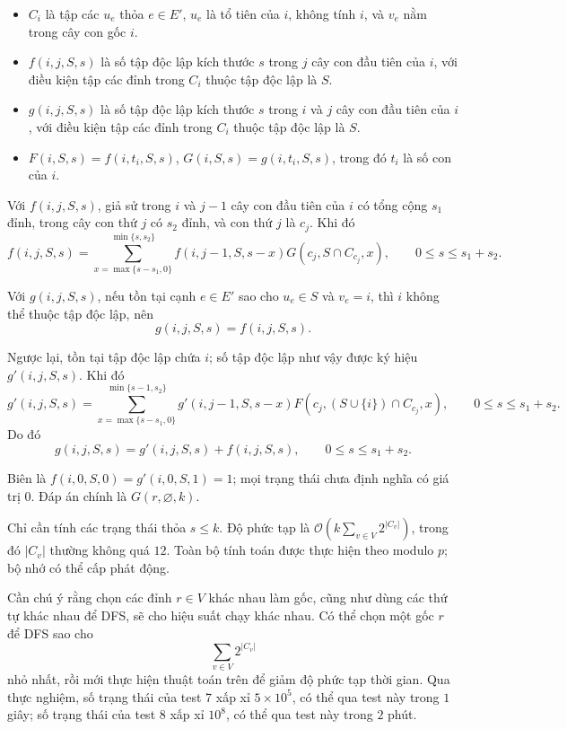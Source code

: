 \documentclass[11pt]{article}
\newcommand{\Oh}{\mathcal{O}}
\begin{document}
\begin{itemize}
  \item \(C_i\) là tập các \(u_e\) thỏa \(e\in E'\), \(u_e\) là tổ tiên của
  \(i\), không tính \(i\), và \(v_e\) nằm trong cây con gốc \(i\).

  \item \(f(i,j,S,s)\) là số tập độc lập kích thước \(s\) trong \(j\) cây con
  đầu tiên của \(i\), với điều kiện tập các đỉnh trong \(C_i\) thuộc tập độc
  lập là \(S\).

  \item \(g(i,j,S,s)\) là số tập độc lập kích thước \(s\) trong \(i\) và \(j\)
  cây con đầu tiên của \(i\), với điều kiện tập các đỉnh trong \(C_i\) thuộc
  tập độc lập là \(S\).

  \item \(F(i,S,s)=f(i,t_i,S,s)\), \(G(i,S,s)=g(i,t_i,S,s)\), trong đó \(t_i\)
  là số con của \(i\).
\end{itemize}

Với \(f(i,j,S,s)\), giả sử trong \(i\) và \(j-1\) cây con đầu tiên của \(i\) có
tổng cộng \(s_1\) đỉnh, trong cây con thứ \(j\) có \(s_2\) đỉnh, và con thứ
\(j\) là \(c_j\). Khi đó
\[
  f(i,j,S,s)=
  \sum_{x=\max\{s-s_1,0\}}^{\min\{s,s_2\}}
    f(i,j-1,S,s-x)G(c_j,S\cap C_{c_j},x),
  \qquad 0\le s\le s_1+s_2.
\]

Với \(g(i,j,S,s)\), nếu tồn tại cạnh \(e\in E'\) sao cho \(u_e\in S\) và
\(v_e=i\), thì \(i\) không thể thuộc tập độc lập, nên
\[
  g(i,j,S,s)=f(i,j,S,s).
\]

Ngược lại, tồn tại tập độc lập chứa \(i\); số tập độc lập như vậy được ký hiệu
\(g'(i,j,S,s)\). Khi đó
\[
  g'(i,j,S,s)=
  \sum_{x=\max\{s-s_1,0\}}^{\min\{s-1,s_2\}}
    g'(i,j-1,S,s-x)F(c_j,(S\cup\{i\})\cap C_{c_j},x),
  \qquad 0\le s\le s_1+s_2.
\]
Do đó
\[
  g(i,j,S,s)=g'(i,j,S,s)+f(i,j,S,s),\qquad 0\le s\le s_1+s_2.
\]

Biên là \(f(i,0,S,0)=g'(i,0,S,1)=1\); mọi trạng thái chưa định nghĩa có giá trị
\(0\). Đáp án chính là \(G(r,\varnothing,k)\).

Chỉ cần tính các trạng thái thỏa \(s\le k\). Độ phức tạp là
\(\Oh\!\left(k\sum_{v\in V}2^{|C_v|}\right)\), trong đó \(|C_v|\) thường không
quá \(12\). Toàn bộ tính toán được thực hiện theo modulo \(p\); bộ nhớ có thể
cấp phát động.

Cần chú ý rằng chọn các đỉnh \(r\in V\) khác nhau làm gốc, cũng như dùng các
thứ tự khác nhau để DFS, sẽ cho hiệu suất chạy khác nhau. Có thể chọn một gốc
\(r\) để DFS sao cho
\[
  \sum_{v\in V}2^{|C_v|}
\]
nhỏ nhất, rồi mới thực hiện thuật toán trên để giảm độ phức tạp thời gian. Qua
thực nghiệm, số trạng thái của test 7 xấp xỉ \(5\times10^5\), có thể qua test
này trong \(1\) giây; số trạng thái của test 8 xấp xỉ \(10^8\), có thể qua
test này trong \(2\) phút.
\end{document}
